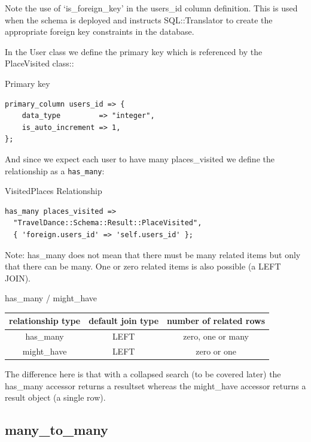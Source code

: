 Note the use of ‘is\_foreign\_key’ in the users\_id column definition. This is used when the schema is deployed and instructs SQL::Translator to create the appropriate foreign key constraints in the database.

In the User class we define the primary key which is referenced by the PlaceVisited class::

\begin{frame}[fragile]{Primary key}
\begin{lstlisting}
primary_column users_id => {
    data_type         => "integer",
    is_auto_increment => 1,
};
\end{lstlisting}
\end{frame}

And since we expect each user to have many places\_visited we define the relationship as a \verb|has_many|:

\begin{frame}[fragile]{VisitedPlaces Relationship}
\begin{lstlisting}
has_many places_visited =>
  "TravelDance::Schema::Result::PlaceVisited",
  { 'foreign.users_id' => 'self.users_id' };
\end{lstlisting}
\end{frame}

Note: has\_many does not mean that there must be many related items but only that there can be many. One or zero related items is also possible (a LEFT JOIN).


\begin{frame}{has\_many / might\_have}
\begin{table}
\begin{tabular}{c | c | c}
relationship type & default join type & number of related rows \\
\hline
has\_many & LEFT & zero, one or many \\
might\_have & LEFT & zero or one \\
\end{tabular}
\end{table}
\end{frame}

The difference here is that with a collapsed search (to be covered later)
the has\_many accessor returns a resultset whereas the might\_have accessor
returns a result object (a single row).

\subsection{many\_to\_many}

